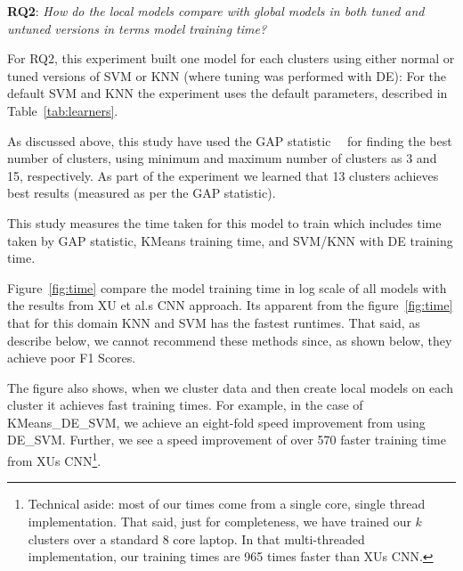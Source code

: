 \documentclass[sigconf]{acmart}
\theoremstyle{break}
\begin{document}
    
 
   \textbf{RQ2}: {\em  How do the local models compare with global models in both tuned and untuned versions in terms model training time?}
    
   
    
    For RQ2, this experiment built one model for each clusters using either normal or tuned versions of 
     SVM or  KNN (where tuning was performed with DE):
      For the default SVM and KNN the experiment uses the default parameters, described in Table~\ref{tab:learners}. 
  
     As discussed above, this study have used the GAP statistic~\cite{mohajer2011comparison}~\cite{tibshirani2001estimating} for finding the best number of clusters, using minimum and maximum number of clusters as 3 and 15, respectively. As part of the experiment we learned that 13 clusters achieves  best results 
     (measured as per the GAP statistic).
     
    This study measures the time taken for this model to train which includes time taken by GAP statistic, KMeans training time, and SVM/KNN with DE training time.
    
   
    Figure~\ref{fig:time} compare the model training time in log scale  of all models with the results
    from XU et al.\textquotesingle s CNN approach.
    Its apparent from the figure~\ref{fig:time} that for this domain KNN and SVM has the fastest runtimes. That said, as describe below, we cannot   recommend these
    methods since, as shown below, they achieve poor F1 Scores.
    
    The figure also shows, when we cluster data and then create local models on each cluster it achieves fast 
    training times.  For example,
    in the case of KMeans\_DE\_SVM, we achieve an eight-fold  speed improvement from using DE\_SVM. 
    Further, we see a speed improvement of over 570 faster training time from XU\textquotesingle s CNN\footnote{
    Technical aside: most of  our times  come from a   single core, single thread implementation.
    That said,  just for completeness, we have trained our   $k$ clusters over a standard 8 core laptop. In that multi-threaded implementation,  our training times
    are 965 times faster than  XU\textquotesingle s CNN.  }.
     
\end{document}
